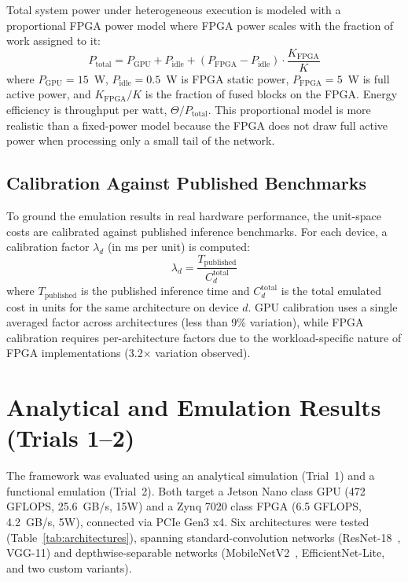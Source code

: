 \documentclass[runningheads]{llncs}
\begin{document}
Total system power under heterogeneous execution is modeled with a proportional FPGA power model where FPGA power scales with the fraction of work assigned to it:
\begin{equation}\label{eq:power}
    P_{\text{total}} = P_{\text{GPU}} + P_{\text{idle}} + (P_{\text{FPGA}} - P_{\text{idle}}) \cdot \frac{K_{\text{FPGA}}}{K}
\end{equation}
where $P_{\text{GPU}} = 15$~W, $P_{\text{idle}} = 0.5$~W is FPGA static power, $P_{\text{FPGA}} = 5$~W is full active power, and $K_{\text{FPGA}}/K$ is the fraction of fused blocks on the FPGA. Energy efficiency is throughput per watt, $\Theta / P_{\text{total}}$. This proportional model is more realistic than a fixed-power model because the FPGA does not draw full active power when processing only a small tail of the network.

\subsection{Calibration Against Published Benchmarks}\label{sec:calibration_method}

To ground the emulation results in real hardware performance, the unit-space costs are calibrated against published inference benchmarks. For each device, a calibration factor $\lambda_d$ (in ms per unit) is computed:
\begin{equation}\label{eq:calibration}
    \lambda_d = \frac{T_{\text{published}}}{C_d^{\text{total}}}
\end{equation}
where $T_{\text{published}}$ is the published inference time and $C_d^{\text{total}}$ is the total emulated cost in units for the same architecture on device $d$. GPU calibration uses a single averaged factor across architectures (less than 9\% variation), while FPGA calibration requires per-architecture factors due to the workload-specific nature of FPGA implementations (3.2$\times$ variation observed).

\section{Analytical and Emulation Results (Trials 1--2)}\label{sec:results}

The framework was evaluated using an analytical simulation (Trial~1) and a functional emulation (Trial~2). Both target a Jetson Nano class GPU (472 GFLOPS, 25.6~GB/s, 15W) and a Zynq 7020 class FPGA (6.5 GFLOPS, 4.2~GB/s, 5W), connected via PCIe Gen3 x4. Six architectures were tested (Table~\ref{tab:architectures}), spanning standard-convolution networks (ResNet-18~\cite{he2016}, VGG-11) and depthwise-separable networks (MobileNetV2~\cite{sandler2018,howard2017}, EfficientNet-Lite, and two custom variants).
\end{document}
